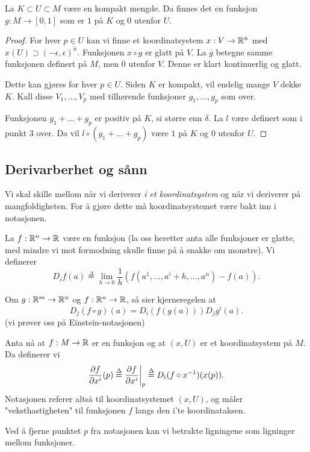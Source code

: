 \documentclass[11pt, english]{article}
\begin{document}
\begin{prop}
La $K \subset U \subset M$ være en kompakt mengde. Da finnes det en funksjon $g:M \to [0,1]$ som er $1$ på $K$ og $0$ utenfor $U$. 
\end{prop}
\begin{proof}
For hver $p \in U$ kan vi finne et koordinatsystem $x:V \to \mathbb{R}^n$ med $x(U) \supset (-\epsilon,\epsilon)^n$. Funksjonen $x \circ g$ er glatt på $V$. La $\overline{g}$ betegne samme funksjonen definert på $M$, men $0$ utenfor $V$. Denne er klart kontinuerlig og glatt. 

Dette kan gjøres for hver $p \in U$. Siden $K$ er kompakt, vil endelig mange $V$ dekke $K$. Kall disse $V_1,\ldots,V_p$ med tilhørende funksjoner $g_1,\ldots,g_p$ som over. 

Funksjonen $g_1+\ldots + g_p$ er positiv på $K$, si større enn $\delta$. La $l$ være definert som i punkt 3 over. Da vil $l \circ(g_1 + \ldots + g_p)$ være $1$ på $K$ og $0$ utenfor $U$. 
\end{proof}

\subsection{Derivarberhet og sånn}

Vi skal skille mellom når vi deriverer \emph{i et koordinatsystem} og når vi deriverer på mangfoldigheten. For å gjøre dette må koordinatsystemet være bakt inn i notasjonen. 

La $f:\mathbb{R}^n \to \mathbb{R}$ være en funksjon (la oss heretter anta alle funksjoner er glatte, med mindre vi mot formodning skulle finne på å snakke om monstre). Vi definerer
$$
D_if(a) \stackrel{\Delta}{=} \lim_{h \to 0} \frac 1h \left( f(a^1, \ldots, a^i +h, \ldots, a^n)-f(a) \right).
$$

Om $g:\mathbb{R}^m \to \mathbb{R}^n$ og $f: \mathbb{R}^n \to \mathbb{R}$, så sier kjerneregelen at
\[
D_j(f \circ g)(a) = D_i(f(g(a))) D_jg^i(a).
\]
(vi prøver oss på Einstein-notasjonen)

Anta nå at $f:M \to \mathbb{R}$ er en funksjon og at $(x,U)$ er et koordinatsystem på $M$. Da definerer vi
\[
\dd{f}{x^i} (p) \stackrel{\Delta}{=} \restr{\dd{f}{x^i}}{p} \stackrel{\Delta}{=} D_i(f \circ x^{-1})(x(p)).
\]
Notasjonen referer altså til koordinatsystemet $(x,U)$, og måler "veksthastigheten" til funksjonen $f$ langs den i'te koordinataksen.

Ved å fjerne punktet $p$ fra notasjonen kan vi betrakte ligningene som ligninger mellom funksjoner. 
\end{document}
